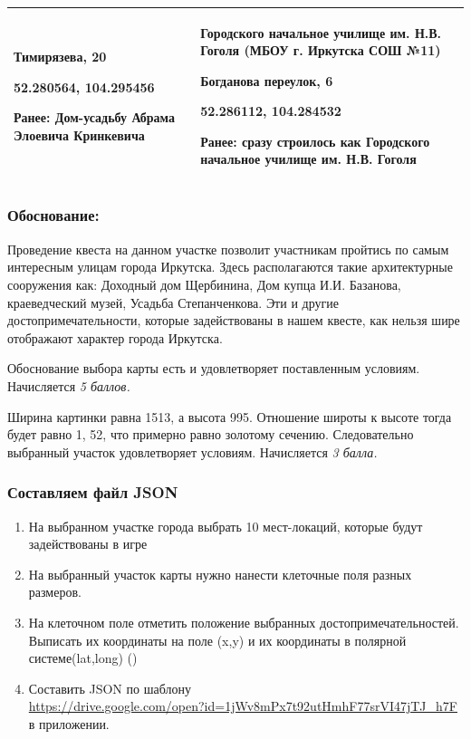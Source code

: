 \begin{longtable}{|p{8cm}|p{8cm}|}
    Тимирязева, 20
    
    52.280564, 104.295456 

    Ранее: Дом-усадьбу Абрама Элоевича Кринкевича & Городского начальное училище им. Н.В. Гоголя (МБОУ г. Иркутска СОШ №11)
    
    Богданова переулок, 6 

    52.286112, 104.284532
    
    Ранее: сразу строилось как Городского начальное училище им. Н.В. Гоголя \\
    \hline    
\end{longtable}

\subsubsection*{Обоснование:}

Проведение квеста на данном участке позволит участникам пройтись по самым интересным улицам города Иркутска. Здесь располагаются такие архитектурные сооружения как:  Доходный дом Щербинина, Дом купца И.И. Базанова, краеведческий музей, Усадьба Степанченкова. Эти и другие достопримечательности, которые задействованы в нашем квесте, как нельзя шире отображают характер города Иркутска. 


\markSection

Обоснование выбора карты есть и удовлетворяет поставленным условиям. Начисляется \textit{5 баллов.}

Ширина картинки равна 1513, а высота 995. Отношение широты к высоте тогда будет равно 1, 52, что примерно равно золотому сечению. Следовательно выбранный участок удовлетворяет условиям. Начисляется \textit{3 балла.}

\subsubsection*{Составляем файл JSON}

\begin{enumerate} 
    \item На выбранном участке города выбрать 10 мест-локаций, которые будут задействованы в игре
    \item На выбранный участок карты нужно нанести клеточные поля разных размеров.
    \item На клеточном поле отметить положение выбранных достопримечательностей. Выписать их координаты на поле (x,y) и их координаты в полярной системе(lat,long) ()
    \item Составить JSON по шаблону \\ \url{https://drive.google.com/open?id=1jWv8mPx7t92utHmhF77srVI47jTJ_h7F} в приложении.
\end{enumerate}

